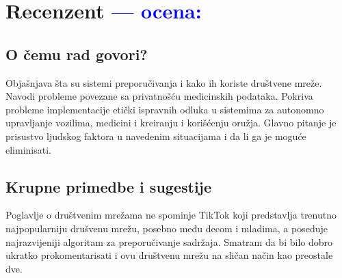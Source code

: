 \documentclass[a4paper]{report}
\newcommand{\odgovor}[1]{\textcolor{blue}{#1}}
\begin{document}
\chapter{Recenzent \odgovor{--- ocena:} }


\section{O čemu rad govori?}
Objašnjava šta su sistemi preporučivanja i kako ih koriste društvene mreže. Navodi probleme povezane sa privatnošću medicinskih  podataka. Pokriva probleme implementacije etički ispravnih odluka u sistemima za autonomno upravljanje vozilima, medicini i kreiranju i korišćenju oružja. Glavno pitanje je prisustvo ljudskog faktora u navedenim situacijama i da li ga je moguće eliminisati.

\section{Krupne primedbe i sugestije}
Poglavlje o društvenim mrežama ne spominje TikTok koji predstavlja trenutno najpopularniju drušvenu mrežu, posebno među decom i mladima, a poseduje najrazvijeniji algoritam za preporučivanje sadržaja. Smatram da bi bilo dobro ukratko prokomentarisati i ovu društvenu mrežu na sličan način kao preostale dve. 
\end{document}
